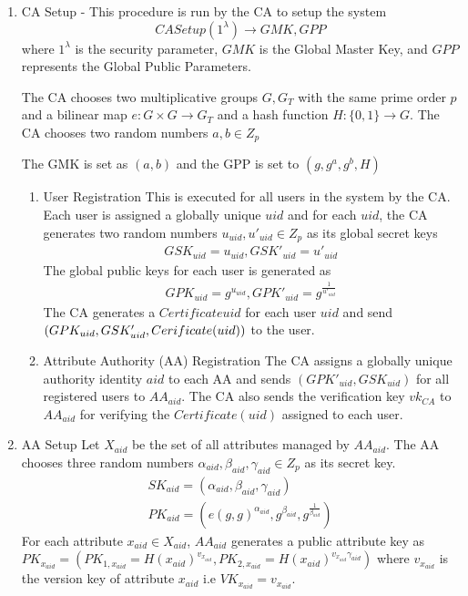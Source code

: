 \begin{enumerate}
	
	\item CA Setup - This procedure is run by the CA to setup the system $$ CASetup(1^{\lambda}) \longrightarrow GMK, GPP $$
	where $ 1^{\lambda} $ is the security parameter, $ GMK $ is the Global Master Key, and $ GPP $ represents the Global Public Parameters.
	
	The CA chooses two multiplicative groups $ G, G_{T} $ with the same prime order $ p $ and a bilinear map $ e \colon G \times G \rightarrow G_{T} $ and a hash function $ H \colon \{0, 1\} \rightarrow G. $ The CA chooses two random numbers $ a, b \in Z_{p} $
	
	The GMK is set as $ (a, b) $ and the GPP is set to $ (g, g^{a}, g^{b}, H) $
	
	\begin{enumerate}
		
		\item User Registration
		This is executed for all users in the system by the CA. Each user is assigned a globally unique $ uid $ and for each $ uid $, the CA generates two random numbers $ u_{uid}, u'_{uid} \in Z_{p} $ as its global secret keys
		\begin{align*}
			GSK_{uid} = u_{uid}, GSK'_{uid} = u'_{uid}
		\end{align*}
		The global public keys for each user is generated as 
		\begin{align*}
			GPK_{uid} = g^{u_{uid}}, GPK'_{uid} = g^{\frac{1}{u'_{uid}}}
		\end{align*}
		The CA generates a $ Certificate{uid} $ for each user $ uid $ and send $ (GPK_{uid}, GSK'_{uid}, \\ Cerificate(uid)) $ to the user.
		
		\item Attribute Authority (AA) Registration
		The CA assigns a globally unique authority identity $ aid $ to each AA and sends $ (GPK'_{uid}, GSK_{uid}) $ for all registered users to $ AA_{aid} $. The CA also sends the verification key $ vk_{CA} $ to $ AA_{aid} $ for verifying the $ Certificate(uid) $ assigned to each user.
		
	\end{enumerate}
	
	\item AA Setup
	Let $ X_{aid} $ be the set of all attributes managed by $ AA_{aid} $. The AA chooses three random numbers $ \alpha_{aid}, \beta_{aid}, \gamma_{aid} \in Z_{p} $ as its secret key.
	\begin{align*}
		SK_{aid} = (\alpha_{aid}, \beta_{aid}, \gamma_{aid}) \\
		PK_{aid} = (e(g, g)^{\alpha_{aid}}, g^{\beta_{aid}}, g^{\frac{1}{\beta_{aid}}})
	\end{align*}
	For each attribute $ x_{aid} \in X_{aid} $, $ AA_{aid} $ generates a public attribute key as $ PK_{x_{aid}} = (PK_{1, x_{aid}} = H(x_{aid})^{v_{x_{aid}}}, PK_{2, x_{aid}} = H(x_{aid})^{v_{x_{aid}}\gamma_{aid}}) $ where $ v_{x_{aid}} $ is the version key of attribute $ x_{aid} $ i.e $ VK_{x_{aid}} = v_{x_{aid}} $.
	

\end{enumerate}
